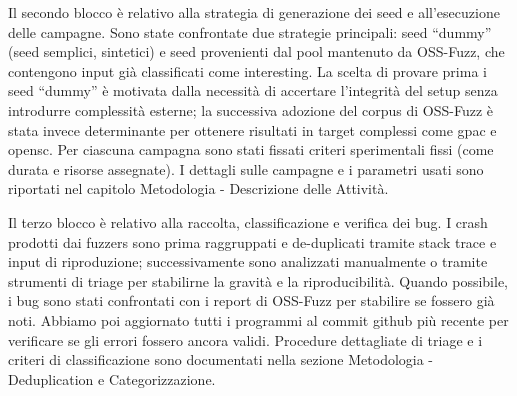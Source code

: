 Il secondo blocco è relativo alla strategia di generazione dei seed e all’esecuzione delle campagne.
Sono state confrontate due strategie principali: seed “dummy” (seed semplici, sintetici) e seed provenienti dal pool mantenuto da OSS-Fuzz, che contengono input già classificati come interesting. 
La scelta di provare prima i seed “dummy” è motivata dalla necessità di accertare l’integrità del setup senza introdurre complessità esterne; la successiva adozione del corpus di OSS-Fuzz è stata invece determinante per ottenere risultati in target complessi come gpac e opensc.
Per ciascuna campagna sono stati fissati criteri sperimentali fissi (come durata e risorse assegnate).
I dettagli sulle campagne e i parametri usati sono riportati nel capitolo Metodologia - Descrizione delle Attività.

Il terzo blocco è relativo alla raccolta, classificazione e verifica dei bug. I crash prodotti dai fuzzers sono prima raggruppati e de-duplicati tramite stack trace e input di riproduzione; successivamente sono analizzati manualmente o tramite strumenti di triage per stabilirne la gravità e la riproducibilità. Quando possibile, i bug sono stati confrontati con i report di OSS-Fuzz per stabilire se fossero già noti. Abbiamo poi aggiornato tutti i programmi al commit github più recente per verificare se gli errori fossero ancora validi. 
Procedure dettagliate di triage e i criteri di classificazione sono documentati nella sezione Metodologia - Deduplication e Categorizzazione.
